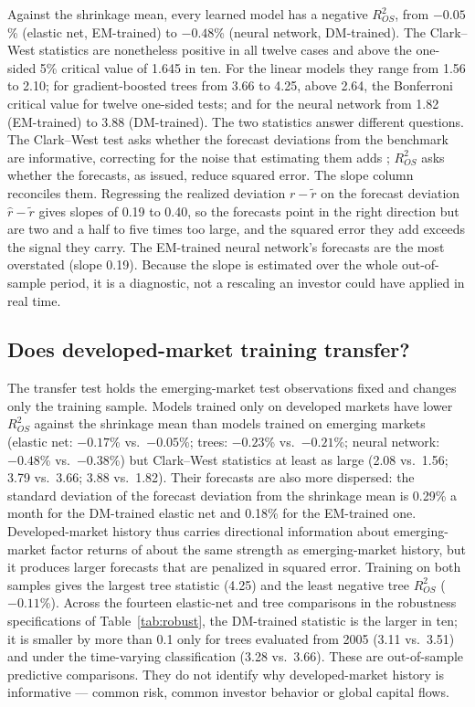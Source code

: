 \documentclass[11pt]{article}
\begin{document}
Against the shrinkage mean, every learned model has a negative $R^2_{OS}$, from $-0.05$\% (elastic net, EM-trained) to $-0.48$\% (neural network, DM-trained). The Clark--West statistics are nonetheless positive in all twelve cases and above the one-sided 5\% critical value of 1.645 in ten. For the linear models they range from 1.56 to 2.10; for gradient-boosted trees from 3.66 to 4.25, above 2.64, the Bonferroni critical value for twelve one-sided tests; and for the neural network from 1.82 (EM-trained) to 3.88 (DM-trained). The two statistics answer different questions. The Clark--West test asks whether the forecast deviations from the benchmark are informative, correcting for the noise that estimating them adds \citep{clark2007approximately}; $R^2_{OS}$ asks whether the forecasts, as issued, reduce squared error. The slope column reconciles them. Regressing the realized deviation $r - \tilde r$ on the forecast deviation $\hat r - \tilde r$ gives slopes of 0.19 to 0.40, so the forecasts point in the right direction but are two and a half to five times too large, and the squared error they add exceeds the signal they carry. The EM-trained neural network's forecasts are the most overstated (slope 0.19). Because the slope is estimated over the whole out-of-sample period, it is a diagnostic, not a rescaling an investor could have applied in real time.



\subsection{Does developed-market training transfer?}
The transfer test holds the emerging-market test observations fixed and changes only the training sample. Models trained only on developed markets have lower $R^2_{OS}$ against the shrinkage mean than models trained on emerging markets (elastic net: $-0.17$\% vs.\ $-0.05$\%; trees: $-0.23$\% vs.\ $-0.21$\%; neural network: $-0.48$\% vs.\ $-0.38$\%) but Clark--West statistics at least as large (2.08 vs.\ 1.56; 3.79 vs.\ 3.66; 3.88 vs.\ 1.82). Their forecasts are also more dispersed: the standard deviation of the forecast deviation from the shrinkage mean is 0.29\% a month for the DM-trained elastic net and 0.18\% for the EM-trained one. Developed-market history thus carries directional information about emerging-market factor returns of about the same strength as emerging-market history, but it produces larger forecasts that are penalized in squared error. Training on both samples gives the largest tree statistic (4.25) and the least negative tree $R^2_{OS}$ ($-0.11$\%). Across the fourteen elastic-net and tree comparisons in the robustness specifications of Table~\ref{tab:robust}, the DM-trained statistic is the larger in ten; it is smaller by more than 0.1 only for trees evaluated from 2005 (3.11 vs.\ 3.51) and under the time-varying classification (3.28 vs.\ 3.66). These are out-of-sample predictive comparisons. They do not identify why developed-market history is informative --- common risk, common investor behavior or global capital flows.
\end{document}

